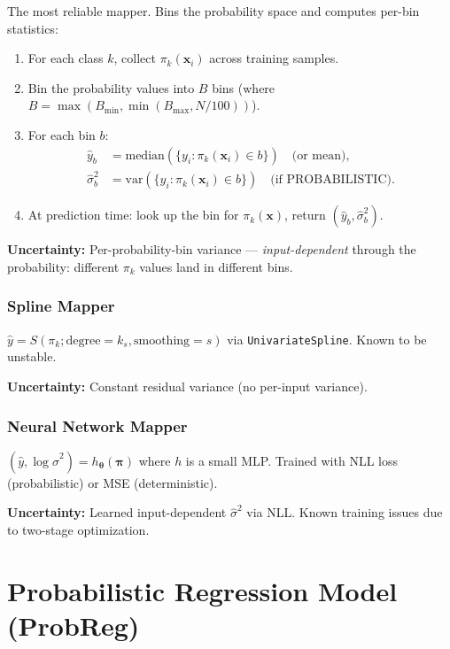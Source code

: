 \documentclass[11pt,a4paper]{article}
\theoremstyle{definition}
\newcommand{\bx}{\mathbf{x}}
\newcommand{\btheta}{\boldsymbol{\theta}}
\newcommand{\bpi}{\boldsymbol{\pi}}
\begin{document}
The most reliable mapper. Bins the probability space and computes per-bin statistics:

\begin{enumerate}[nosep]
  \item For each class $k$, collect $\pi_k(\bx_i)$ across training samples.
  \item Bin the probability values into $B$ bins (where $B = \max(B_{\min}, \min(B_{\max}, N/100))$).
  \item For each bin $b$:
    \begin{align}
      \hat{y}_b &= \mathrm{median}(\{y_i : \pi_k(\bx_i) \in b\}) \quad \text{(or mean)}, \\
      \hat{\sigma}^2_b &= \mathrm{var}(\{y_i : \pi_k(\bx_i) \in b\}) \quad \text{(if PROBABILISTIC)}.
    \end{align}
  \item At prediction time: look up the bin for $\pi_k(\bx)$, return $(\hat{y}_b, \hat{\sigma}^2_b)$.
\end{enumerate}

\textbf{Uncertainty:} Per-probability-bin variance --- \emph{input-dependent}
through the probability: different $\pi_k$ values land in different bins.

\subsubsection{Spline Mapper}

$\hat{y} = S(\pi_k; \text{degree}=k_s, \text{smoothing}=s)$ via
\texttt{UnivariateSpline}. Known to be unstable.

\textbf{Uncertainty:} Constant residual variance (no per-input variance).

\subsubsection{Neural Network Mapper}

$(\hat{y}, \log\hat{\sigma}^2) = h_\btheta(\bpi)$ where $h$ is a small MLP.
Trained with NLL loss (probabilistic) or MSE (deterministic).

\textbf{Uncertainty:} Learned input-dependent $\hat{\sigma}^2$ via NLL.
Known training issues due to two-stage optimization.

\section{Probabilistic Regression Model (ProbReg)}
\label{sec:probreg}
\end{document}
